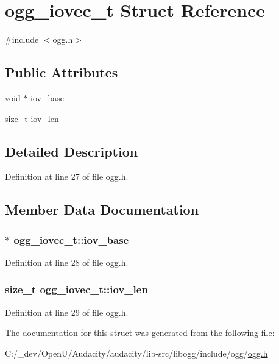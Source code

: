 \hypertarget{structogg__iovec__t}{}\section{ogg\+\_\+iovec\+\_\+t Struct Reference}
\label{structogg__iovec__t}


{\ttfamily \#include $<$ogg.\+h$>$}

\subsection*{Public Attributes}
\begin{DoxyCompactItemize}
\item 
\hyperlink{sound_8c_ae35f5844602719cf66324f4de2a658b3}{void} $\ast$ \hyperlink{structogg__iovec__t_a07c65ea68e539cc10ed1670c0de8aea0}{iov\+\_\+base}
\item 
size\+\_\+t \hyperlink{structogg__iovec__t_a52b887e0511104920cdc181c9e4136ce}{iov\+\_\+len}
\end{DoxyCompactItemize}


\subsection{Detailed Description}


Definition at line 27 of file ogg.\+h.



\subsection{Member Data Documentation}
\subsubsection[{\texorpdfstring{iov\+\_\+base}{iov_base}}]{$\ast$ ogg\+\_\+iovec\+\_\+t\+::iov\+\_\+base}\hypertarget{structogg__iovec__t_a07c65ea68e539cc10ed1670c0de8aea0}{}\label{structogg__iovec__t_a07c65ea68e539cc10ed1670c0de8aea0}


Definition at line 28 of file ogg.\+h.

\subsubsection[{\texorpdfstring{iov\+\_\+len}{iov_len}}]{\setlength{\rightskip}{0pt plus 5cm}size\+\_\+t ogg\+\_\+iovec\+\_\+t\+::iov\+\_\+len}\hypertarget{structogg__iovec__t_a52b887e0511104920cdc181c9e4136ce}{}\label{structogg__iovec__t_a52b887e0511104920cdc181c9e4136ce}


Definition at line 29 of file ogg.\+h.



The documentation for this struct was generated from the following file\+:\begin{DoxyCompactItemize}
\item 
C\+:/\+\_\+dev/\+Open\+U/\+Audacity/audacity/lib-\/src/libogg/include/ogg/\hyperlink{ogg_8h}{ogg.\+h}\end{DoxyCompactItemize}

